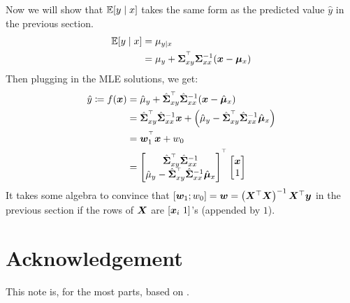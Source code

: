 \documentclass[letterpaper,12pt]{article}
\theoremstyle{plain}
\theoremstyle{definition}
\theoremstyle{remark}
\begin{document}
Now we will show that $\mathbb{E}[y \mid x]$ takes the same form as the predicted value $\hat{y}$ in the previous section.
\begin{align}
    \mathbb{E}[y \mid x] & = \mu_{y \mid x}                                           \\
                 & = \mu_y + {\bm{\Sigma}}_{xy}^{^{\top}} {\bm{\Sigma}}_{xx}^{-1} ({\bm{x}} - {\bm{\mu}}_x)
\end{align}
Then plugging in the MLE solutions, we get:
\begin{align}
    \hat{y} \coloneqq f({\bm{x}}) & = \hat{\mu}_y + \hat{{\bm{\Sigma}}}_{xy}^{^{\top}} \hat{{\bm{\Sigma}}}_{xx}^{-1} ({\bm{x}} - \hat{{\bm{\mu}}}_x)                                                                                                                   \\
                             & = \hat{{\bm{\Sigma}}}_{xy}^{^{\top}} \hat{{\bm{\Sigma}}}_{xx}^{-1} {\bm{x}} + \left( \hat{\mu}_y  - \hat{{\bm{\Sigma}}}_{xy}^{^{\top}} \hat{{\bm{\Sigma}}}_{xx}^{-1} \hat{{\bm{\mu}}}_x \right)                                                       \\
                             & = {\bm{w}}_1^{^{\top}} {\bm{x}} + w_0                                                                                                                                                                                 \\
                             & = \begin{bmatrix} \hat{{\bm{\Sigma}}}_{xy}^{^{\top}} \hat{{\bm{\Sigma}}}_{xx}^{-1} \\ \hat{\mu}_y  - \hat{{\bm{\Sigma}}}_{xy}^{^{\top}} \hat{{\bm{\Sigma}}}_{xx}^{-1} \hat{{\bm{\mu}}}_x \end{bmatrix}^{^{\top}} \begin{bmatrix} {\bm{x}} \\ 1 \end{bmatrix}
\end{align}
It takes some algebra to convince that $[{\bm{w}}_1; w_0] = {\bm{w}} = \left( {\bm{X}}^\top {\bm{X}} \right)^{-1} {\bm{X}}^\top {\bm{y}}$ in the previous section if the rows of ${\bm{X}}$ are $[{\bm{x}}_i ~1]$'s (appended by $1$).


\section*{Acknowledgement}

This note is, for the most parts, based on \citet{pml1Book}.




\newpage
\appendix
\onecolumn
\end{document}
